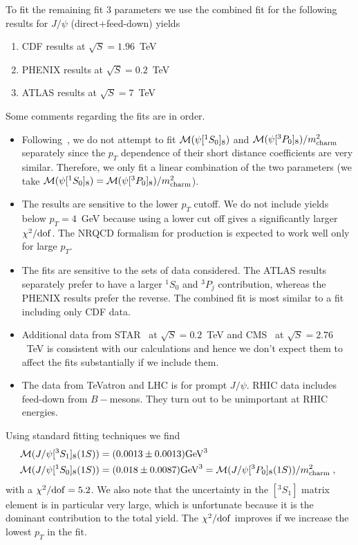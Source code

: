 \documentclass[article,showpacs,preprintnumbers,amsmath,amssymb]{revtex4}
\newcommand{\rGeV}{{\rm GeV}}
\newcommand{\rdof}{{\rm dof}}
\newcommand{\charm}{{\rm{charm}}}
\begin{document}
\begin{appendix}
To fit the remaining fit $3$ parameters we use the combined fit for the 
following results for $J/\psi$ (direct+feed-down) yields
\begin{enumerate}
\item{CDF results at $\sqrt{S}=1.96$~TeV~\cite{Acosta:2004yw}}
\item{PHENIX results at $\sqrt{S}=0.2$~TeV~\cite{Adare:2009js}}
\item{ATLAS results at $\sqrt{S}=7$~TeV~\cite{Aad:2011sp}}
\end{enumerate}

Some comments regarding the fits are in order.
\begin{itemize}
\item{Following~\cite{Cho:1995ce,Cho:1995vh}, we do not attempt to fit
${\cal{M}}(\psi[^1S_0]_{8})$ and ${\cal{M}}(\psi[^3P_0]_{8})/m_{\charm}^2$ separately
since the $p_T$ dependence of their short distance coefficients are very
similar. Therefore, we only fit a linear combination of the two parameters (we
take ${\cal{M}}(\psi[^1S_0]_{8})={\cal{M}}(\psi[^3P_0]_{8})/m_{\charm}^2$).}
\item{The results are sensitive to the lower $p_T$ cutoff. We do not include
yields below $p_T=4$~GeV because using a lower cut off gives
a significantly larger $\chi^2/\rdof$. The NRQCD formalism for production is
expected to work well only for large $p_T$.}
\item{The fits are sensitive to the sets of data considered. The ATLAS results
separately prefer to have a larger $^1S_0$ and $^3P_j$ contribution, whereas the
PHENIX results prefer the reverse. The combined fit is most similar to a fit
including only CDF data.}
\item{Additional data from STAR~\cite{Abelev:2009qaa} at $\sqrt{S}=0.2$~TeV and 
CMS~\cite{Chatrchyan:2012np} at $\sqrt{S}=2.76$~TeV is consistent with
our calculations and hence we don't expect them to affect the fits
substantially if we include them.}
\item{The data from TeVatron and LHC is for prompt $J/\psi$. RHIC data includes
feed-down from $B-$mesons. They turn out to be unimportant at RHIC energies.}
\end{itemize}

Using standard fitting techniques we find
\begin{equation}
\begin{split}
{\cal{M}}(J/\psi[^3S_1]_{8}(1S)) &= (0.0013\pm 0.0013) \rGeV^3\\
{\cal{M}}(J/\psi[^1S_0]_{8}(1S)) &= (0.018\pm 0.0087) \rGeV^3=
{\cal{M}}(J/\psi[^3P_0]_{8}(1S))/m_{\charm}^2\;,
~\label{eq:MJn1CO_val}
\end{split}
\end{equation}
with a $\chi^2/\rdof=5.2$. We also note that the uncertainty in the
$[^3S_1]$ matrix element is in particular very large, which is unfortunate
because it is the dominant contribution to the total yield. The $\chi^2/\rdof$
improves if we increase the lowest $p_T$ in the fit.


\end{appendix}
\end{document}
